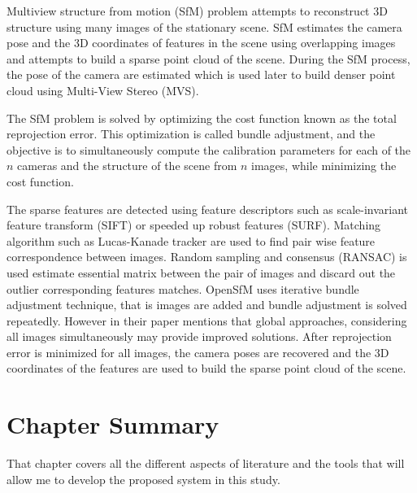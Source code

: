 Multiview structure from motion (SfM) problem attempts to reconstruct 3D structure using many images of the stationary scene. SfM estimates the camera pose and the 3D coordinates of features in the scene using overlapping images and attempts to build a sparse point cloud of the scene. During the SfM process, the pose of the camera are estimated which is used later to build denser point cloud using Multi-View Stereo (MVS).

The SfM problem is solved by optimizing the cost function known as the total reprojection error. This optimization is called bundle adjustment, and the objective is to simultaneously compute the calibration parameters for each of the $n$ cameras and the structure of the scene from $n$ images, while minimizing the cost function.

The sparse features are detected using feature descriptors such as scale-invariant feature transform (SIFT) or speeded up robust features (SURF). Matching algorithm such as Lucas-Kanade tracker are used to find pair wise feature correspondence between images. Random sampling and consensus (RANSAC) is used estimate essential matrix between the pair of images and discard out the outlier corresponding features matches. OpenSfM uses iterative bundle adjustment technique, that is images are added and bundle adjustment is solved repeatedly. However  in their paper mentions that global approaches, considering all images simultaneously may provide improved solutions. After reprojection error is minimized for all images, the camera poses are recovered and the 3D coordinates of the features are used to build the sparse point cloud of the scene.

\section{Chapter Summary}
That chapter covers all the different aspects of literature and the tools that will allow me to develop the proposed system in this study. 

\FloatBarrier


